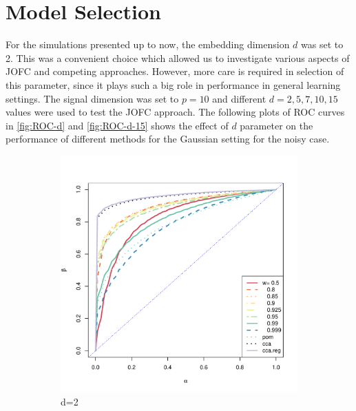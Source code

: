 \documentclass[11pt]{article} %
\begin{document}
\section{Model Selection}
For the simulations presented up to now, the embedding dimension $d$ was set to 2. This was a convenient choice which allowed us to investigate various aspects of JOFC and competing approaches.
However,  more care is required in selection of this parameter, since it plays such a big role in performance in general learning settings. The signal dimension was set to $p=10$ and different $d=2,5,7,10,15$ values were used to test the JOFC approach.
The following plots of ROC curves in    \ref{fig:ROC-d} and  \ref{fig:ROC-d-15} shows the effect of $d$ parameter on the performance of different methods for the Gaussian setting for the noisy case. 
\begin{figure}
 \centering
  \captionsetup[subfigure]{labelformat=empty}
        \begin{subfigure}[b]{0.5\textwidth}        
               \includegraphics[width=\textwidth]{ROC-d-2.pdf}
                \caption{d=2}
                \label{fig:ROC-d-2}
        \end{subfigure}%
        \begin{subfigure}[b]{0.5\textwidth}           

\end{subfigure}
\end{figure}
\end{document}
